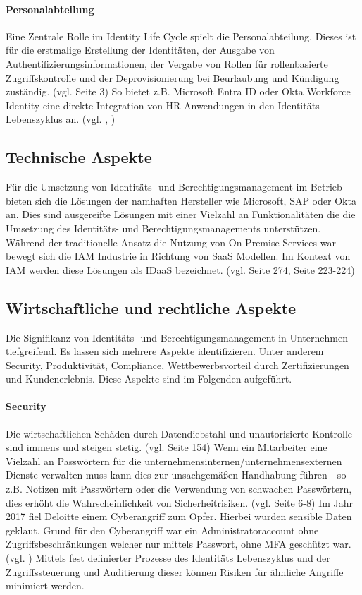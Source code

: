 \documentclass[11pt]{article}
\begin{document}
\paragraph{Personalabteilung}
Eine Zentrale Rolle im Identity Life Cycle spielt die Personalabteilung. Dieses ist für die erstmalige Erstellung der Identitäten, der Ausgabe von Authentifizierungsinformationen, der Vergabe von Rollen für rollenbasierte Zugriffskontrolle und der Deprovisionierung bei Beurlaubung und Kündigung zuständig. (vgl. \cite{mohammed2017systematic} Seite 3) So bietet z.B. Microsoft Entra ID oder Okta Workforce Identity eine direkte Integration von HR Anwendungen in den Identitäts Lebenszyklus an. (vgl. \cite{oktahr}, \cite{Billmath2024})
\subsection{Technische Aspekte}
Für die Umsetzung von Identitäts- und Berechtigungsmanagement im Betrieb bieten sich die Lösungen der namhaften Hersteller wie Microsoft, SAP oder Okta an. Dies sind ausgereifte Lösungen mit einer Vielzahl an Funktionalitäten die die Umsetzung des Identitäts- und Berechtigungsmanagements unterstützen. Während der traditionelle Ansatz die Nutzung von On-Premise Services war bewegt sich die IAM Industrie in Richtung von SaaS Modellen. Im Kontext von IAM werden diese Lösungen als IDaaS bezeichnet. (vgl. \cite{kunz2014analyzing} Seite 274, \cite{tsolkas2017} Seite 223-224)
\subsection{Wirtschaftliche und rechtliche Aspekte}
Die Signifikanz von Identitäts- und Berechtigungsmanagement in Unternehmen tiefgreifend. Es lassen sich mehrere Aspekte identifizieren. Unter anderem Security, Produktivität, Compliance, Wettbewerbsvorteil durch Zertifizierungen und Kundenerlebnis. Diese Aspekte sind im Folgenden aufgeführt.
\paragraph{Security}
Die wirtschaftlichen Schäden durch Datendiebstahl und unautorisierte Kontrolle sind immens und steigen stetig. (vgl. \cite{furnell2020understanding} Seite 154) Wenn ein Mitarbeiter eine Vielzahl an Passwörtern für die unternehmensinternen/unternehmensexternen Dienste verwalten muss kann dies zur unsachgemäßen Handhabung führen - so z.B. Notizen mit Passwörtern oder die Verwendung von schwachen Passwörtern, dies erhöht die Wahrscheinlichkeit von Sicherheitrisiken. (vgl. \cite{haag2012selecting} Seite 6-8) Im Jahr 2017 fiel Deloitte einem Cyberangriff zum Opfer. Hierbei wurden sensible Daten geklaut. Grund für den Cyberangriff war ein Administratoraccount ohne Zugriffsbeschränkungen welcher nur mittels Passwort, ohne MFA geschützt war. (vgl. \cite{deloitte2017}) Mittels fest definierter Prozesse des Identitäts Lebenszyklus und der Zugriffssteuerung und Auditierung dieser können Risiken für ähnliche Angriffe minimiert werden.
\end{document}
